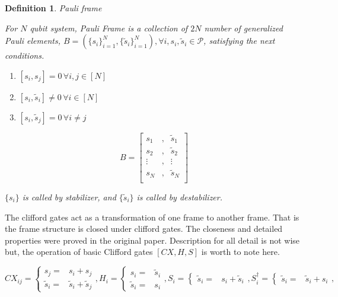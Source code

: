 \documentclass[a4paper,12pt]{article}
\newtheorem{definition}{Definition}
\begin{document}
\begin{definition}{Pauli frame}

    For $N$ qubit system, Pauli Frame is a collection of $2N$ number of 
    generalized Pauli elements, $B = (\{s_i\}_{i=1}^N, \{\tilde{s}_i\}_{i=1}^N), \forall i, s_i, \tilde{s}_i \in \mathcal{P}$,
    satisfying the next conditions.

    \begin{enumerate}
            \item $[s_i, s_j] = 0 \,\forall i, j \in [N]$
            \item $[s_i, \tilde{s}_i] \neq 0 \, \forall i \in [N]$
            \item $[s_i, \tilde{s}_j] = 0 \, \forall i\neq j$
    \end{enumerate}

    \begin{equation*}
        B = \begin{bmatrix}
            s_1 &, & \tilde{s}_1 \\
            s_2 &, & \tilde{s}_2 \\
            \vdots  &,&\vdots   \\
            s_N &, & \tilde{s}_N \\
        \end{bmatrix}
    \end{equation*}

    $\{s_i\}$ is called by \textit{stabilizer}, and $\{\tilde{s}_i\}$ is called by \textit{destabilizer}. 
\end{definition}

The clifford gates act as a transformation of one frame to another frame.
That is the frame structure is closed under clifford gates.
The closeness and detailed properties were proved in the original paper\cite{schmitz_graph_2023}.
Description for all detail is not wise but, the operation of basic Clifford gates $[CX, H, S]$
is worth to note here.

\begin{equation}
    CX_{ij} = \begin{cases}
        s_j =& s_i + s_j\\
        \tilde{s}_i =& \tilde{s}_i + \tilde{s}_j
    \end{cases},
    H_i =  \begin{cases}
        s_i =& \tilde{s}_i\\
        \tilde{s}_i =&s_i 
    \end{cases},
    S_i =  \begin{cases}
        \tilde{s}_i =&s_i + \tilde{s}_i  
    \end{cases},
    S^\dagger_i = \begin{cases}
        \tilde{s}_i =& \tilde{s}_i  + s_i
    \end{cases},
\end{equation}
\end{document}
